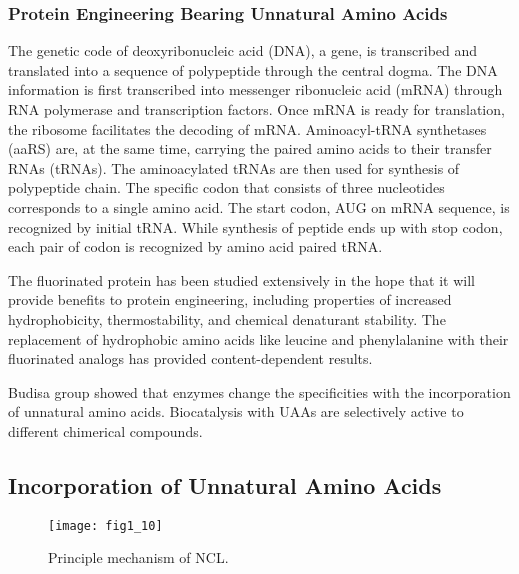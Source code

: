 \begin{refsection}
\subsubsection{Protein Engineering Bearing Unnatural Amino Acids}
\label{sec:uaa-intro}

The genetic code of deoxyribonucleic acid (DNA), a gene, is transcribed and
translated into a sequence of polypeptide through the central
dogma\cite{CRICK1970}. The DNA information is first transcribed into messenger
ribonucleic acid (mRNA) through RNA polymerase and transcription factors. Once
mRNA is ready for translation, the ribosome facilitates the decoding of mRNA.
Aminoacyl-tRNA synthetases (aaRS) are, at the same time, carrying the paired
amino acids to their transfer RNAs (tRNAs). The aminoacylated tRNAs are then
used for synthesis of polypeptide chain. The specific codon that consists of
three nucleotides corresponds to a single amino acid. The start codon, AUG on
mRNA sequence, is recognized by initial tRNA. While synthesis of peptide ends
up with stop codon, each pair of codon is recognized by amino acid paired
tRNA\cite{Sadava2006}.

The fluorinated protein has been studied extensively in the hope that it will
provide benefits to protein engineering, including properties of increased
hydrophobicity, thermostability, and chemical denaturant
stability\cite{Voloshchuk2007b}. The replacement of hydrophobic amino acids
like leucine and phenylalanine with their fluorinated analogs has provided
content-dependent results.

Budisa group showed that enzymes change the specificities with the
incorporation of unnatural amino acids\cite{Budisa2006}. Biocatalysis with UAAs
are selectively active to different chimerical compounds. 

\subsection{Incorporation of Unnatural Amino Acids} 
\label{sec:rsi-intro}

\begin{figure}[h!] \centering \texttt{[image: fig1\_10]}
    \caption[Princilple mechanism of NCL.]{Principle mechanism of NCL.} 
    \label{fig:ncl-intro} 
\end{figure}


\end{refsection}
